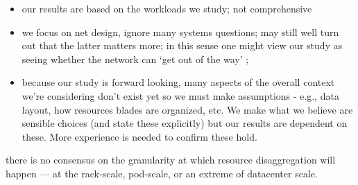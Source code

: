 \noindent
{}
\begin{itemize} 
\item our results are based on the workloads we study; not comprehensive
\item we focus on net design, ignore many systems questions; may still well turn out that the latter matters more; in this sense one might view our study as seeing whether the network can `get out of the way’ \cite{};
\item because our study is forward looking, many aspects of the overall context we’re considering don’t exist yet so we must make assumptions - e.g., data layout, how resources blades are organized, etc.  We make what we believe are sensible choices (and state these explicitly) but our results are dependent on these. More experience is needed to confirm these hold.
\end{itemize} 

  there is no consensus on the granularity at which resource disaggregation will happen --- at the rack-scale, pod-scale, or an extreme of datacenter scale. 

